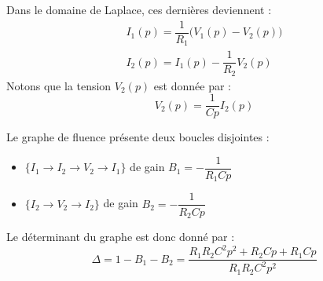 Dans le domaine de Laplace, ces dernières deviennent :
\begin{align*}
    I_1(p)=\dfrac{1}{R_1}\big(V_1(p)-V_2(p)\big)\\
    I_2(p)=I_1(p)-\dfrac{1}{R_2}V_2(p)
\end{align*}
Notons que la tension $V_2(p)$ est donnée par :
\[
    V_2(p)=\dfrac{1}{Cp}I_2(p)
\]
\begin{center}
    
\end{center}
Le graphe de fluence présente deux boucles disjointes :
\begin{itemize}
    \item $\{I_1\rightarrow I_2\rightarrow V_2\rightarrow I_1\}$ 
          de gain $B_1=-\dfrac{1}{R_1Cp}$ 
    \item $\{I_2\rightarrow V_2\rightarrow I_2\}$ de gain $B_2=-\dfrac{1}{R_2Cp}$ 
\end{itemize}
Le déterminant du graphe est donc donné par :
\[
    \Delta=1-B_1-B_2=\dfrac{R_1R_2C^2p^2+R_2Cp+R_1Cp}{R_1R_2C^2p^2}
\]


